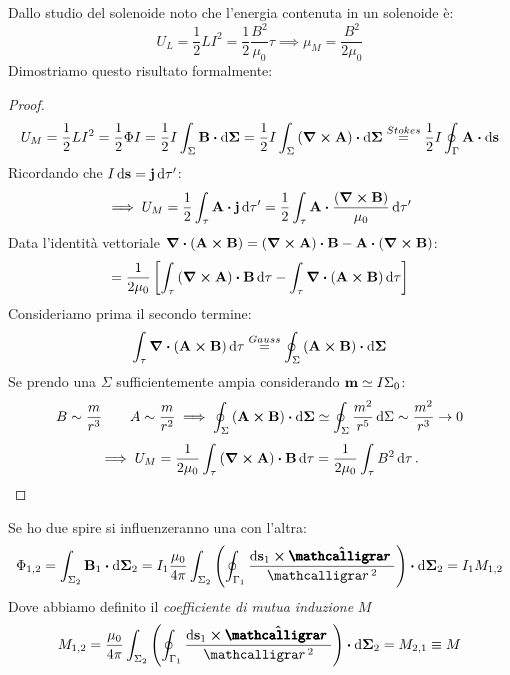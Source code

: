 \documentclass[12pt,a4paper]{article}
\begin{document}
Dallo studio del solenoide noto che l'energia contenuta in un solenoide è:
\begin{equation*}
    U_L = \frac{1}{2}LI^2= \frac{1}{2}\frac{B^2}{\mu_0}\tau\implies \mu_M= \frac{B^2}{2\mu_0}
\end{equation*}
Dimostriamo questo risultato formalmente:
\begin{proof}
    \begin{equation*}
        U_M = \frac{1}{2}LI^2= \frac{1}{2}\Phi I= \frac{1}{2}I\int_\Sigma\vb{B}\vdot\dd{\vb{\Sigma}}= 
    \frac{1}{2}I\int_\Sigma\left( \curl{\vb{A}} \right)\vdot\dd{\vb{\Sigma}}\overset{Stokes}{=}\frac{1}{2}I\oint_\Gamma\vb{A}\vdot\dd{\vb{s}}
    \end{equation*}
    Ricordando che $I\dd{\vb{s}}= \vb{j}\dd{\tau'}$:
    \begin{equation*}
        \implies U_M = \frac{1}{2}\int_\tau\vb{A}\vdot\vb{j}\dd{\tau'} = 
        \frac{1}{2}\int_\tau\vb{A}\vdot\frac{\left( \curl{\vb{B}} \right)}{\mu_0}\dd{\tau'}
    \end{equation*}
    Data l'identità vettoriale $\div(\vb{A}\cp\vb{B})=\left( \curl{\vb{A}} \right)\vdot\vb{B}-\vb{A}\vdot\left( \curl{\vb{B}} \right)$:
    \begin{equation*}
        =\frac{1}{2\mu_0}\left[ \int_\tau \left( \curl{\vb{A}} \right)\vdot\vb{B}\dd{\tau}-\int_\tau\div(\vb{A}\cp\vb{B})\dd{\tau} \right]
    \end{equation*}
    Consideriamo prima il secondo termine:
    \begin{equation*}
        \int_\tau\div(\vb{A}\cp\vb{B})\dd{\tau}\overset{Gauss}{=} \oint_\Sigma\left(\vb{A}\cp\vb{B}\right)\vdot\dd{\vb{\Sigma}}
    \end{equation*}
    Se prendo una $\Sigma$ sufficientemente ampia considerando $\vb{m}\simeq I\Sigma_0$:
    \begin{equation*}
        B \sim\frac{m}{r^3}\qquad A \sim\frac{m}{r^2} \implies\oint_\Sigma\left( \vb{A}\cp\vb{B} \right)\vdot\dd{\vb{\Sigma}}\simeq
        \oint_\Sigma\frac{m^2}{r^5}\dd{\Sigma}\sim \frac{m^2}{r^3}\rightarrow0
    \end{equation*}
    \begin{equation*}
        \implies U_M= \frac{1}{2\mu_0}\int_\tau\left( \curl{\vb{A}} \right)\vdot \vb{B}\dd{\tau}= \frac{1}{2\mu_0}\int_\tau B^2\dd{\tau}.
    \end{equation*}
\end{proof}

Se ho due spire si influenzeranno una con l'altra:
\begin{equation*}
    \Phi_{1,2}=\int_{\Sigma_2}\vb{B}_1\vdot\dd{\vb{\Sigma}_2}= I_1 \frac{\mu_0}{4\pi}\int_{\Sigma_2}
    \left( \oint_{\Gamma_1} \frac{\dd{\vb{s}_1}\cp\vu{\boldscriptr}}{\scriptr^2}\right)\vdot\dd{\vb{\Sigma}_2}= I_1M_{1,2}
\end{equation*}
Dove abbiamo definito il \textit{coefficiente di mutua induzione} $M$
\begin{equation*}
    M_{1,2}= \frac{\mu_0}{4\pi}\int_{\Sigma_2}\left( \oint_{\Gamma_1} \frac{\dd{\vb{s}_1}\cp\vu{\boldscriptr}}{\scriptr^2}\right)
    \vdot\dd{\vb{\Sigma}_2}= M_{2,1}\equiv M 
\end{equation*}
\end{document}
